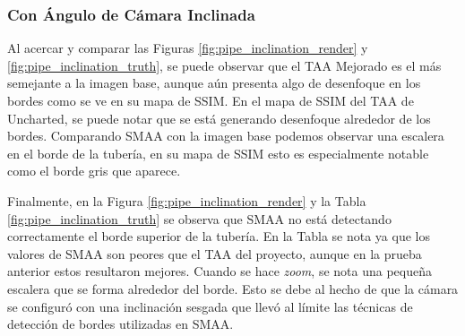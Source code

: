 \documentclass[pregrado]{tesis-usb} %
\begin{document}
\FloatBarrier

\subsubsection{Con Ángulo de Cámara Inclinada}
Al acercar y comparar las Figuras \ref{fig:pipe_inclination_render} y \ref{fig:pipe_inclination_truth}, se puede observar que el TAA Mejorado es el más semejante a la imagen base, aunque aún presenta algo de desenfoque en los bordes como se ve en su mapa de SSIM. En el mapa de SSIM del TAA de Uncharted, se puede notar que se está generando desenfoque alrededor de los bordes. Comparando SMAA con la imagen base podemos observar una escalera en el borde de la tubería, en su mapa de SSIM esto es especialmente notable como el borde gris que aparece.

Finalmente, en la Figura \ref{fig:pipe_inclination_render} y la Tabla \ref{fig:pipe_inclination_truth} se observa que SMAA no está detectando correctamente el borde superior de la tubería. En la Tabla se nota ya que los valores de SMAA son peores que el TAA del proyecto, aunque en la prueba anterior estos resultaron mejores. Cuando se hace \textit{zoom}, se nota una pequeña escalera que se forma alrededor del borde. Esto se debe al hecho de que la cámara se configuró con una inclinación sesgada que llevó al límite las técnicas de detección de bordes utilizadas en SMAA.
\end{document}
